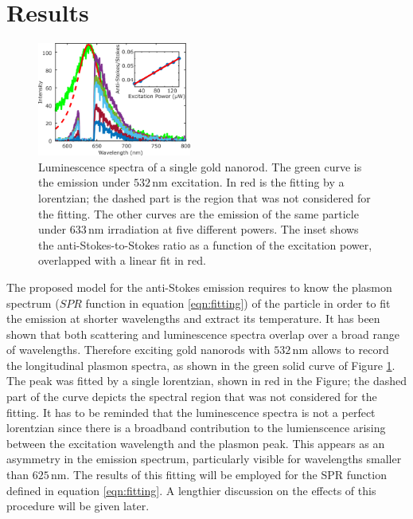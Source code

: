 \documentclass[journal=nalefd,manuscript=letter]{achemso}
\newcommand{\nm}{\ensuremath{\,\textrm{nm}}}
\begin{document}
\section{Results}
\begin{figure}[htp] \centering
\includegraphics[width=0.45\textwidth]{Figures/02_Several_Intensities/02_several_intensities.png}
\caption{Luminescence spectra of a single gold nanorod. The green curve is the
emission under $532\nm$ excitation. In red is the fitting by a lorentzian; the
dashed part is the region that was not considered for the fitting. The other
curves are the emission of the same particle under $633\nm$ irradiation at five 
different powers. The inset shows the anti-Stokes-to-Stokes ratio as a function
of the excitation power, overlapped with a linear fit in red.}
	\label{fig:spectra_rod}
\end{figure}

The proposed model for the anti-Stokes emission requires to know the plasmon
spectrum ($SPR$ function in equation \ref{eqn:fitting}) of the particle in order
to fit the emission at shorter wavelengths and extract its temperature. It has
been shown that both scattering and luminescence spectra overlap over a broad
range of wavelengths\cite{Yorulmaz2012}. Therefore exciting gold nanorods with
$532\nm$ allows to record the longitudinal plasmon spectra, as shown in the
green solid curve of Figure \ref{fig:spectra_rod}. The peak was fitted by a
single lorentzian, shown in red in the Figure; the dashed part of the curve
depicts the spectral region that was not considered for the fitting. It has to
be reminded that the luminescence spectra is not a perfect lorentzian since
there is a broadband contribution to the lumienscence arising between the
excitation wavelength and the plasmon peak\cite{Boyd1986}. This appears as an
asymmetry in the emission spectrum, particularly visible for wavelengths smaller
than $625\nm$. The results of this fitting will be employed for the SPR function
defined in equation \ref{eqn:fitting}. A lengthier discussion on the effects of
this procedure will be given later.
\end{document}
